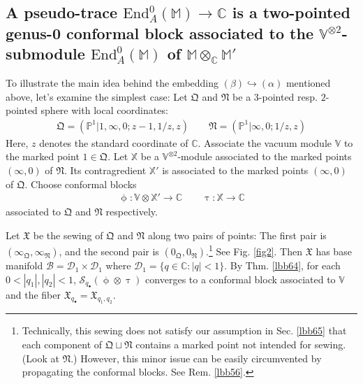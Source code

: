 \documentclass[11pt,b5paper,notitlepage]{article}
\theoremstyle{definition}
\theoremstyle{plain}
\newcommand{\fk}{\mathfrak}
\newcommand{\End}{\mathrm{End}} %
\newcommand{\blt}{\bullet}
\newcommand{\Vbb}{\mathbb V}
\newcommand{\Xbb}{\mathbb X}
\newcommand{\Mbb}{\mathbb M}
\newcommand{\Cbb}{\mathbb C}
\newcommand{\Pbb}{\mathbb P}
\newcommand{\<}{\left\langle}
\renewcommand{\>}{\right\rangle}
\newcommand{\MB}{\mathcal{B}}
\newcommand{\fx}{\mathfrak{X}}
\newcommand{\MD}{\mathcal{D}}
\newcommand{\MS}{\mathcal{S}}
\newcommand{\fq}{{\mathfrak Q}}
\newcommand{\fn}{\mathfrak{N}}
\numberwithin{equation}{subsection}
\begin{document}
\subsection{A pseudo-trace $\End^0_A(\Mbb)\rightarrow\Cbb$ is a two-pointed genus-0 conformal block associated to the $\Vbb^{\otimes 2}$-submodule $\End^0_A(\Mbb)$ of $\Mbb\otimes_\Cbb\Mbb'$}



To illustrate the main idea behind the embedding $(\beta)\hookrightarrow(\alpha)$ mentioned above, let's examine the simplest case: Let $\fk Q$ and $\fn$ be a $3$-pointed resp. $2$-pointed sphere with local coordinates:
\begin{align*}
\fk Q=(\Pbb^1|1, \infty,0;z-1,1/z,z)\qquad \fk N=(\Pbb^1|\infty,0;1/z,z)
\end{align*}   
Here, $z$ denotes the standard coordinate of $\Cbb$. Associate the vacuum module $\Vbb$ to the marked point $1\in\fk Q$. Let $\Xbb$ be a $\Vbb^{\otimes 2}$-module associated to the marked points $(\infty,0)$ of $\fn$. Its contragredient $\Xbb'$ is associated to the marked points $(\infty,0)$ of $\fk Q$. Choose conformal blocks
\begin{align*}
\upphi:\Vbb\otimes\Xbb'\rightarrow\Cbb\qquad \uptau:\Xbb\rightarrow \Cbb
\end{align*}
associated to $\fk Q$ and $\fn$ respectively.


Let $\fx$ be the sewing of $\fq$ and $\fn$ along two pairs of points: The first pair is $(\infty_\fq,\infty_\fn)$, and the second pair is $(0_\fq,0_\fn)$.\footnote{Technically, this sewing does not satisfy our assumption in Sec. \ref{lbb65} that each component of $\fq\sqcup\fn$ contains a marked point not intended for sewing. (Look at $\fn$.) However, this minor issue can be easily circumvented by propagating the conformal blocks. See Rem. \ref{lbb56}.} See Fig. \ref{fig2}. Then $\fx$ has base manifold $\MB=\MD_1\times\MD_1$ where $\MD_1=\{q\in\Cbb:|q|<1\}$. By Thm. \ref{lbb64}, for each $0<|q_1|,|q_2|<1$,  $\MS_{q_\blt}(\upphi\otimes\uptau)$ converges to a conformal block associated to $\Vbb$ and the fiber $\fx_{q_\blt}=\fx_{q_1,q_2}$. 
\end{document}
